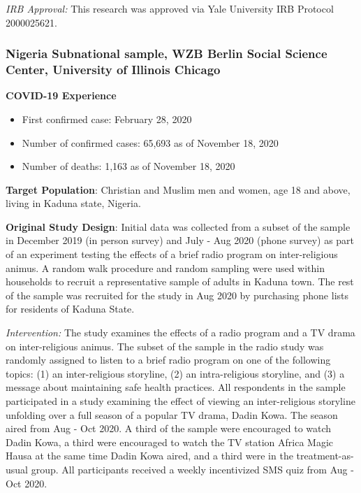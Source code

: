 \documentclass[
  12pt,
]{article}
\begin{document}
\emph{IRB Approval:} This research was approved via Yale University IRB Protocol 2000025621.

\hypertarget{nigeria-subnational-sample-wzb-berlin-social-science-center-university-of-illinois-chicago}{%
\subsubsection*{Nigeria Subnational sample, WZB Berlin Social Science Center, University of Illinois Chicago}\label{nigeria-subnational-sample-wzb-berlin-social-science-center-university-of-illinois-chicago}}

\textbf{COVID-19 Experience}

\begin{itemize}
\item First confirmed case: February 28, 2020
\item Number of confirmed cases: 65,693 as of November 18, 2020 
\item Number of deaths:  1,163 as of November 18, 2020 
\end{itemize}

\textbf{Target Population}: Christian and Muslim men and women, age 18 and above, living in Kaduna state, Nigeria.

\textbf{Original Study Design}: Initial data was collected from a subset of the sample in December 2019 (in person survey) and July - Aug 2020 (phone survey) as part of an experiment testing the effects of a brief radio program on inter-religious animus. A random walk procedure and random sampling were used within households to recruit a representative sample of adults in Kaduna town. The rest of the sample was recruited for the study in Aug 2020 by purchasing phone lists for residents of Kaduna State.

\emph{Intervention:} The study examines the effects of a radio program and a TV drama on inter-religious animus. The subset of the sample in the radio study was randomly assigned to listen to a brief radio program on one of the following topics: (1) an inter-religious storyline, (2) an intra-religious storyline, and (3) a message about maintaining safe health practices. All respondents in the sample participated in a study examining the effect of viewing an inter-religious storyline unfolding over a full season of a popular TV drama, Dadin Kowa. The season aired from Aug - Oct 2020. A third of the sample were encouraged to watch Dadin Kowa, a third were encouraged to watch the TV station Africa Magic Hausa at the same time Dadin Kowa aired, and a third were in the treatment-as-usual group. All participants received a weekly incentivized SMS quiz from Aug - Oct 2020.
\end{document}
